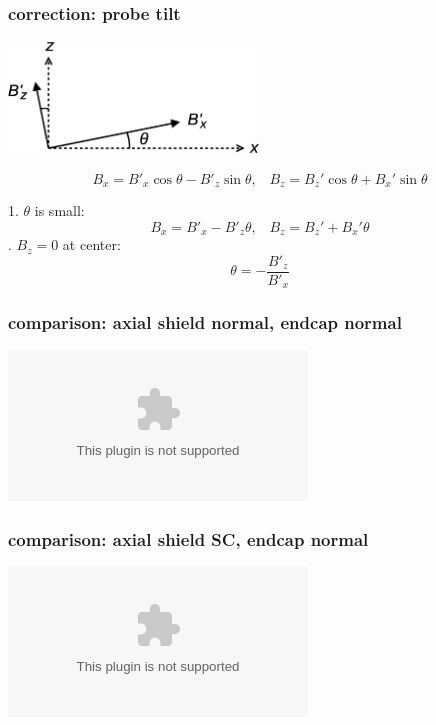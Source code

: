 \documentclass{beamer}
\newcommand{\pyplot}{\includegraphics[width=\textwidth, trim=60px 60px 60px 40px]}
\begin{document}
\begin{frame}
\frametitle{correction: probe tilt}
    
    \begin{center}
        \includegraphics[width=0.5\textwidth]{figures/probe_tilt.eps}
    \end{center} \pause
    \begin{equation}
        B_x = B'_x \cos\theta - B'_z \sin\theta, \;\;\; B_z = B_z' \cos\theta + B_x' \sin\theta
    \end{equation}

    \pause

    \bigskip

    1. $\theta$ is small: \pause
    \begin{equation*}
        B_x = B'_x - B'_z \theta, \;\;\; B_z = B_z' + B_x' \theta
    \end{equation*} . $B_z = 0$ at center: \pause
    \begin{equation*}
        \theta = -\frac{B'_z}{B'_x}
    \end{equation*}

\end{frame}

\begin{frame}
\frametitle{comparison: axial shield normal, endcap normal}

    \begin{center}
        \pyplot{figures/normnorm_comp.eps}
    \end{center}
    
\end{frame}

\begin{frame}
\frametitle{comparison: axial shield SC, endcap normal}

    \begin{center}
        \pyplot{figures/SCnorm_comp_new.eps}
    \end{center}
    
\end{frame}

%
%
%
%
%
\end{document}
